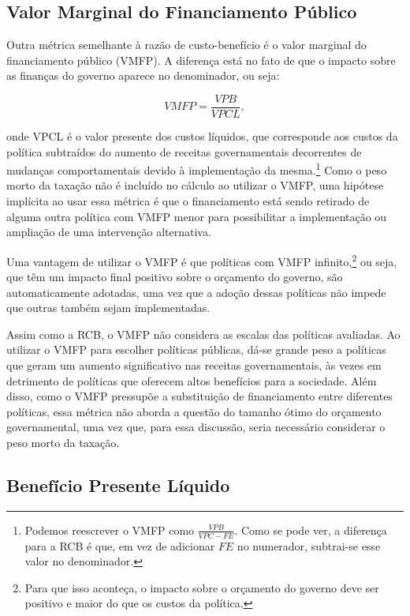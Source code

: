 \documentclass[12pt,letterpaper]{article}
\newcommand{\1}{\mathbbm{1}}
\numberwithin{equation}{section}
\begin{document}
\subsection{Valor Marginal do Financiamento Público}

Outra métrica semelhante à razão de custo-benefício é o valor marginal do financiamento público (VMFP). A diferença está no fato de que o impacto sobre as finanças do governo aparece no denominador, ou seja:

\begin{equation}
    VMFP = \frac{VPB}{VPCL},
\end{equation}

\noindent onde VPCL é o valor presente dos custos líquidos, que corresponde aos custos da política subtraídos do aumento de receitas governamentais decorrentes de mudanças comportamentais devido à implementação da mesma.\footnote{Podemos reescrever o VMFP como $\frac{VPB}{VPC-FE}$. Como se pode ver, a diferença para a RCB é que, em vez de adicionar $FE$ no numerador, subtrai-se esse valor no denominador.} Como o peso morto da taxação não é incluído no cálculo ao utilizar o VMFP, uma hipótese implícita ao usar essa métrica é que o financiamento está sendo retirado de alguma outra política com VMFP menor para possibilitar a implementação ou ampliação de uma intervenção alternativa.

Uma vantagem de utilizar o VMFP é que políticas com VMFP infinito,\footnote{Para que isso aconteça, o impacto sobre o orçamento do governo deve ser positivo e maior do que os custos da política.} ou seja, que têm um impacto final positivo sobre o orçamento do governo, são automaticamente adotadas, uma vez que a adoção dessas políticas não impede que outras também sejam implementadas.

Assim como a RCB, o VMFP não considera as escalas das políticas avaliadas. Ao utilizar o VMFP para escolher políticas públicas, dá-se grande peso a políticas que geram um aumento significativo nas receitas governamentais, às vezes em detrimento de políticas que oferecem altos benefícios para a sociedade. Além disso, como o VMFP pressupõe a substituição de financiamento entre diferentes políticas, essa métrica não aborda a questão do tamanho ótimo do orçamento governamental, uma vez que, para essa discussão, seria necessário considerar o peso morto da taxação.

\subsection{Benefício Presente Líquido}
\end{document}
